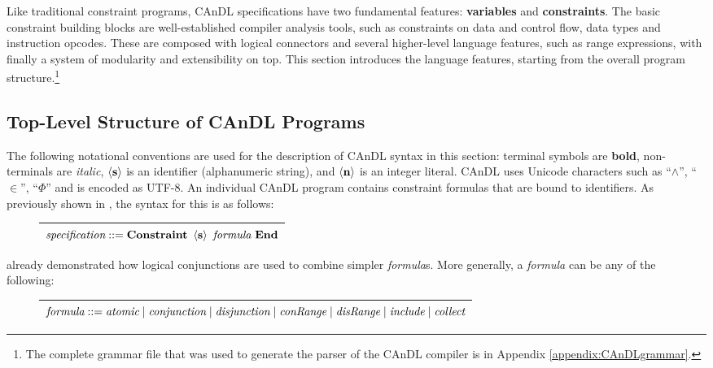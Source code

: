     Like traditional constraint programs, CAnDL specifications have two
    fundamental features: \textbf{variables} and \textbf{constraints}.
    The basic constraint building blocks are well-established compiler analysis
    tools, such as constraints on data and control flow, data types and
    instruction opcodes.
    These are composed with logical connectors and several higher-level language
    features, such as range expressions, with finally a system of modularity and
    extensibility on top.
    This section introduces the language features, starting from the overall
    program structure.\footnote{The complete grammar file that was used to
    generate the parser of the CAnDL compiler is in Appendix
    \ref{appendix:CAnDLgrammar}.}

\subsection{Top-Level Structure of CAnDL Programs}

    The following notational conventions are used for the description of CAnDL
    syntax in this section:
    terminal symbols are {\bf bold}, non-terminals are {\it italic},
    $\left<\text{\bf s}\right>$ is an identifier (alphanumeric string), and
    $\left<\text{\bf n}\right>$ is an integer literal.
    CAnDL uses Unicode characters such as ``$\land$'', ``$\in$'', ``$\Phi$'' and
    is encoded as UTF-8.
    An individual CAnDL program contains constraint formulas that are
    bound to identifiers.
    As previously shown in , the syntax for this is as
    follows:
\begin{figure}[H]
\centering
\begin{tabular}{|c|}
    \hline
    $\text{\it specification} ::= \text{\bf Constraint}\ \left<\text{\bf s}\right>\ \text{\it formula}\ \text{\bf End}$\\
    \hline
\end{tabular}
\end{figure}

     already demonstrated how logical conjunctions are used
    to combine simpler {\it formula}s.
    More generally, a {\it formula} can be any of the following:
\begin{figure}[H]
\centering
\begin{tabular}{|c|}
    \hline
    $\text{\it formula} ::= \text{\it atomic}\mid\text{\it conjunction}\mid\text{\it disjunction}\mid\text{\it conRange}\mid \text{\it disRange}\mid\text{\it include}\mid\text{\it collect}$\\
    \hline
\end{tabular}
\end{figure}

